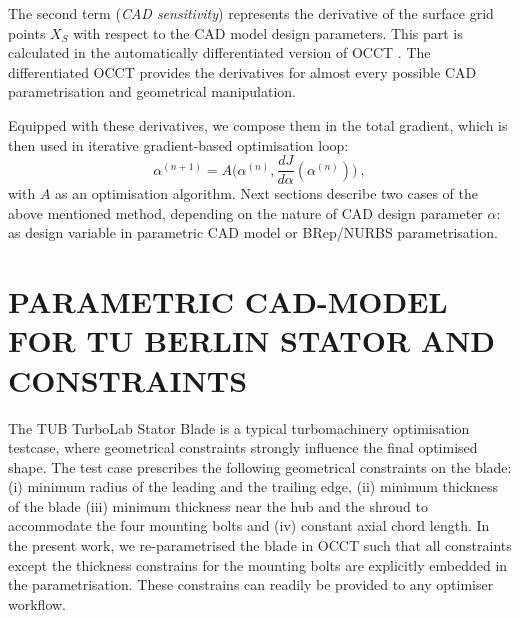 \documentclass[9pt,academicons]{article}
\begin{document}

The second term (\textit{CAD sensitivity}) represents the derivative of the surface grid points $X_S$ with respect to the CAD model design parameters. This part is calculated in the automatically differentiated version of OCCT \cite{auriemma2016optimisation}. The differentiated OCCT provides the derivatives for almost every possible CAD parametrisation and geometrical manipulation. 



Equipped with these derivatives, we compose them in the total gradient, which is then used in iterative gradient-based optimisation loop:
\begin{equation}
\label{eq:generalStep}
\alpha^{(n+1)} =  A\big(\alpha^{(n)}, \frac{dJ}{d\alpha}(\alpha^{(n)})\big) \:,\end{equation}
with $A$ as an optimisation algorithm. 
Next sections describe two cases of the above mentioned method, depending on the nature of CAD design parameter $\alpha$: as design variable in parametric CAD model or BRep/NURBS parametrisation.

\section{PARAMETRIC CAD-MODEL FOR TU BERLIN STATOR AND CONSTRAINTS}
\label{sec:paramtub}
The TUB TurboLab Stator Blade \cite{tubwebsite} is a typical turbomachinery optimisation testcase, where geometrical constraints strongly influence the final optimised shape. The test case prescribes the following geometrical constraints on the blade: (i) minimum radius of the leading and the trailing edge, (ii) minimum thickness of the blade (iii) minimum thickness near the hub and the shroud to accommodate the four mounting bolts and (iv) constant axial chord length. In the present work, we re-parametrised the blade in OCCT such that all constraints except the thickness constrains for the mounting bolts are explicitly embedded in the parametrisation. These constrains can readily be provided to any optimiser workflow.
\end{document}
